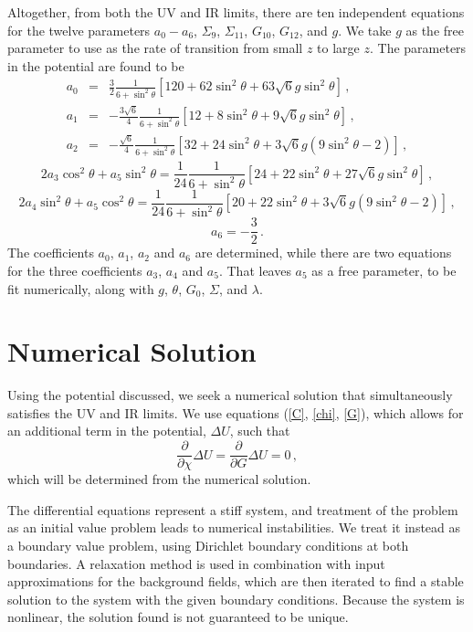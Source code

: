 \documentclass[aps,prd,12pt,nofootinbib]{revtex4}
\newcommand{\be}{\begin{equation}}
\newcommand{\ee}{\end{equation}}
\newcommand{\ba}{\begin{eqnarray}}
\newcommand{\ea}{\end{eqnarray}}
\def\rt6{\sqrt{6}}
\begin{document}
Altogether, from both the UV and IR limits, there are ten independent equations for the twelve parameters $a_0 - a_6$, $\Sigma_9$, $\Sigma_{11}$, $G_{10}$, $G_{12}$, and $g$.  
We take $g$ as the free parameter to use as the rate of transition from small $z$ to large $z$.  
The parameters in the potential are found to be
\ba
a_0 &=&  \frac{3}{2} \frac{1}{6 + \sin^2 \theta}\left[ 120 + 62 \sin^2 \theta + 63 \rt6 g \sin^2 \theta \right] \, , \\
a_1 &=&  -\frac{3\rt6}{4} \frac{1}{6 + \sin^2 \theta}\left[ 12 + 8 \sin^2 \theta + 9 \rt6 g \sin^2 \theta \right] \, , \\
a_2 &=&  -\frac{\rt6}{4} \frac{1}{6 + \sin^2 \theta}\left[ 32 + 24 \sin^2 \theta + 3 \rt6 g(9 \sin^2 \theta - 2) \right] \, ,
\ea
\be
2 a_3 \cos^2 \theta + a_5 \sin^2 \theta = \frac{1}{24} \frac{1}{6 + \sin^2 \theta}\left[ 24 + 22 \sin^2 \theta + 27 \rt6 g \sin^2 \theta \right] \, ,
\ee
\be
2 a_4 \sin^2 \theta + a_5 \cos^2 \theta = \frac{1}{24} \frac{1}{6 + \sin^2 \theta}\left[ 20 +22 \sin^2 \theta   +  3 \rt6 g (9 \sin^2 \theta -2) \right] \, ,
\ee
\be
a_6 = -\frac{3}{2} \, .
\ee
The coefficients $a_0$, $a_1$, $a_2$ and $a_6$ are determined, while there are two equations for the three coefficients $a_3$, $a_4$ and $a_5$.  
That leaves $a_5$ as a free parameter, to be fit numerically, along with $g$, $\theta$, $G_0$, $\Sigma$, and $\lambda$.

\section{Numerical Solution}

Using the potential discussed, we seek a numerical solution that simultaneously satisfies the UV and IR limits. 
We use equations (\ref{C}, \ref{chi}, \ref{G}), which allows for an additional term in the potential, $\Delta U$, such that 
\be
\frac{\partial }{\partial \chi} \Delta U = \frac{\partial }{\partial G}\Delta U = 0 \, ,
\ee
which will be determined from the numerical solution.

The differential equations represent a stiff system, and treatment of the problem as an initial value problem leads to numerical instabilities. 
We treat it instead as a boundary value problem, using Dirichlet boundary conditions at both boundaries. 
A relaxation method is used in combination with input approximations for the background fields, which are then iterated to find a stable solution to the system with the given boundary conditions. 
Because the system is nonlinear, the solution found is not guaranteed to be unique.
\end{document}
